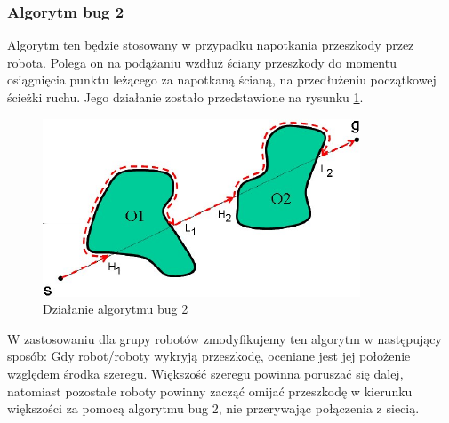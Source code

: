 \documentclass[a4paper, 12pt]{article}
\begin{document}
\subsubsection{Algorytm bug 2}
	Algorytm ten będzie stosowany w przypadku napotkania przeszkody przez robota. Polega on na podążaniu wzdłuż ściany przeszkody do momentu osiągnięcia punktu leżącego za napotkaną ścianą, na przedłużeniu początkowej ścieżki ruchu. Jego działanie zostało przedstawione na rysunku \ref{bug2_img}.
	\begin{figure}[h!]
	\centering
	\includegraphics*[width=0.7\columnwidth]{img/40-0.png}
	\caption{Działanie algorytmu bug 2}
	\label{bug2_img}
	\end{figure}
	W zastosowaniu dla grupy robotów zmodyfikujemy ten algorytm w następujący sposób:
	Gdy robot/roboty wykryją przeszkodę, oceniane jest jej położenie względem środka szeregu. Większość szeregu powinna poruszać się dalej, natomiast pozostałe roboty powinny zacząć omijać przeszkodę w kierunku większości za pomocą algorytmu bug 2, nie przerywając połączenia z siecią.
\end{document}
